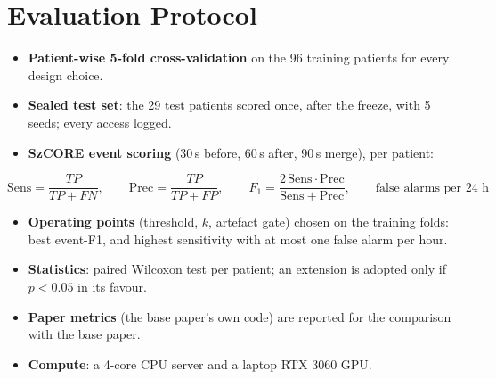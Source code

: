 \section{Evaluation Protocol}\label{sec:eval}

\begin{itemize}
\item \textbf{Patient-wise 5-fold cross-validation} on the 96 training patients for every design choice.
\item \textbf{Sealed test set}: the 29 test patients scored once, after the freeze, with 5 seeds; every access logged.
\item \textbf{SzCORE event scoring} \cite{dan2024szcore} (30\,s before, 60\,s after, 90\,s merge), per patient:
\end{itemize}
\begin{equation}
  \mathrm{Sens} = \frac{TP}{TP + FN},\qquad \mathrm{Prec} = \frac{TP}{TP + FP},\qquad
  F_1 = \frac{2\,\mathrm{Sens}\cdot\mathrm{Prec}}{\mathrm{Sens} + \mathrm{Prec}},\qquad \text{false alarms per 24 h}
\end{equation}
\begin{itemize}
\item \textbf{Operating points} (threshold, $k$, artefact gate) chosen on the training folds: best event-F1, and highest
  sensitivity with at most one false alarm per hour.
\item \textbf{Statistics}: paired Wilcoxon test per patient; an extension is adopted only if $p < 0.05$ in its favour.
\item \textbf{Paper metrics} (the base paper's own code) are reported for the comparison with the base paper.
\item \textbf{Compute}: a 4-core CPU server and a laptop RTX 3060 GPU.
\end{itemize}

